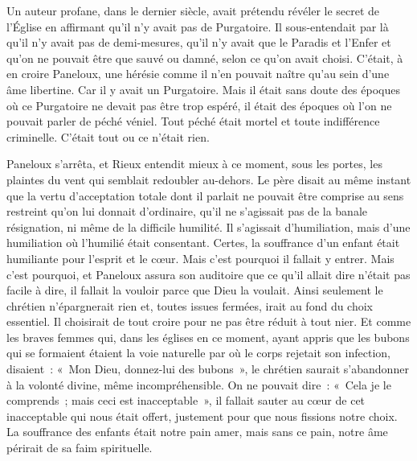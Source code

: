 \documentclass[french,twoside]{book} %
\begin{document}
Un auteur profane, dans le dernier siècle, avait prétendu révéler le secret de l’Église en affirmant qu’il n’y avait pas de Purgatoire. Il sous-entendait par là qu’il n’y avait pas de demi-mesures, qu’il n’y avait que le Paradis et l’Enfer et qu’on ne pouvait être que sauvé ou damné, selon ce qu’on avait choisi. C’était, à en croire Paneloux, une hérésie comme il n’en pouvait naître qu’au sein d’une âme libertine. Car il y avait un Purgatoire. Mais il était sans doute des époques où ce Purgatoire ne devait pas être trop espéré, il était des époques où l’on ne pouvait parler de péché véniel. Tout péché était mortel et toute indifférence criminelle. C’était tout ou ce n’était rien.\par
Paneloux s’arrêta, et Rieux entendit mieux à ce moment, sous les portes, les plaintes du vent qui semblait redoubler au-dehors. Le père disait au même instant que la vertu d’acceptation totale dont il parlait ne pouvait être comprise au sens restreint qu’on lui donnait d’ordinaire, qu’il ne s’agissait pas de la banale résignation, ni même de la difficile humilité. Il s’agissait d’humiliation, mais d’une humiliation où l’humilié était consentant. Certes, la souffrance d’un enfant était humiliante pour l’esprit et le cœur. Mais c’est pourquoi il fallait y entrer. Mais c’est pourquoi, et Paneloux assura son auditoire que ce qu’il allait dire n’était pas facile à dire, il fallait la vouloir parce que Dieu la voulait. Ainsi seulement le chrétien n’épargnerait rien et, toutes issues fermées, irait au fond du choix essentiel. Il choisirait de tout croire pour ne pas être réduit à tout nier. Et comme les braves femmes qui, dans les églises en ce moment, ayant appris que les bubons qui se formaient étaient la voie naturelle par où le corps rejetait son infection, disaient : « Mon Dieu, donnez-lui des bubons », le chrétien saurait s’abandonner à la volonté divine, même incompréhensible. On ne pouvait dire : « Cela je le comprends ; mais ceci est inacceptable », il fallait sauter au cœur de cet inacceptable qui nous était offert, justement pour que nous fissions notre choix. La souffrance des enfants était notre pain amer, mais sans ce pain, notre âme périrait de sa faim spirituelle.\par
\end{document}
